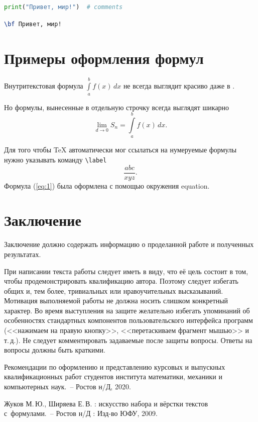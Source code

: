 \documentclass[14pt]{mmcs_article}
\begin{document}
\begin{lstlisting}[language=Python, caption={Python, пример кода}, label=stud-lst:2]
print("Привет, мир!")  # comments
\end{lstlisting}

\begin{lstlisting}[language=TeX, caption=\LaTeX, label=stud-lst:3]
% параметр language в наших листингах только для себя
\bf Привет, мир!
\end{lstlisting}



\newpage
\section{Примеры оформления формул}

Внутритекстовая формула
$ \int\limits_a^b f(x)\,dx$ не всегда выглядит красиво даже в \LaTeXe.

Но формулы, вынесенные в отдельную строчку всегда выглядят шикарно
\[
  \lim_{d\to 0} S_n =
  \int\limits_a^b f(x)\,dx.
\]

Для того чтобы {\TeX} автоматически мог ссылаться на нумеруемые формулы нужно указывать команду \verb"\label"
\begin{equation}\label{eq:1}
  \frac{abc}{xyz}.
\end{equation}
Формула (\ref{eq:1}) была оформлена с помощью окружения \textsf{equation}.

\newpage
{}
\section*{Заключение}

Заключение должно содержать информацию о проделанной работе и полученных результатах.

При написании текста работы следует иметь в виду, что её цель состоит в том, чтобы продемонстрировать квалификацию автора. Поэтому следует избегать общих и, тем более, тривиальных или нравоучительных высказываний. Мотивация выполняемой работы не должна носить слишком конкретный характер. Во время выступления на защите желательно избегать упоминаний об особенностях стандартных компонентов пользовательского интерфейса программ (<<нажимаем на правую кнопку>>, <<перетаскиваем фрагмент мышью>> и т.\,д.). Не следует комментировать задаваемые после защиты вопросы. Ответы на вопросы должны быть краткими.



\newpage

\renewcommand{\refname}{\centering \textbf{Литература}}

\begin{thebibliography}{0}
Рекомендации по оформлению
и представлению курсовых
и выпускных квалификационных работ
студентов института математики,
механики и компьютерных наук.~--
Ростов н/Д, 2020.

Жуков М.\,Ю., Ширяева Е.\,В.
\LaTeXe: искусство набора и вёрстки текстов с~формулами.~-- Ростов н/Д : Изд-во ЮФУ, 2009.
\end{thebibliography}
\end{document}
